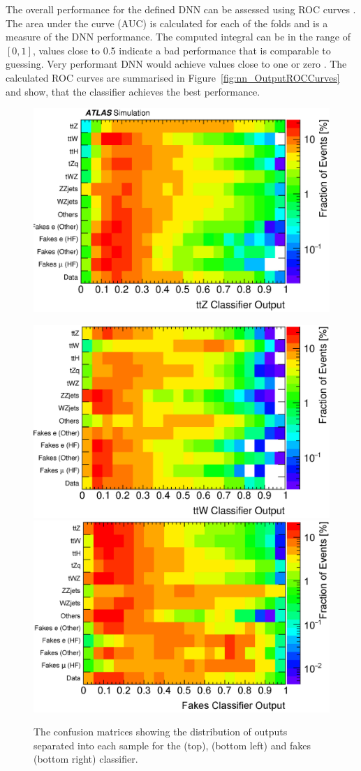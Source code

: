 \documentclass[bachelor,oneside, BCOR10mm,
			ngerman,english  %
]{GAUBM}
\begin{document}
 The overall performance for the defined DNN can be assessed using ROC curves \cite{nn_roccurve}. The area under the curve (AUC) is calculated for each of the folds and is a measure of the DNN performance. The computed integral can be in the range of $[0,1]$, values close to 0.5 indicate a bad performance that is comparable to guessing. Very performant DNN would achieve values close to one or zero \cite{nn_roccurve}. The calculated ROC curves are summarised in Figure~\ref{fig:nn_OutputROCCurves} and show, that the \ttbarW classifier achieves the best performance. %
 
\begin{figure}
	\centering
	\includegraphics[width=.42\textwidth]{figures/neural_networks/output/MyModel_Confusion_ttZ.eps}
	
	\includegraphics[width=.42\textwidth]{figures/neural_networks/output/MyModel_Confusion_ttW.eps}\hspace{8mm}
	\includegraphics[width=.424\textwidth]{figures/neural_networks/output/MyModel_Confusion_Fakes.eps}
	\caption{The confusion matrices showing the distribution of outputs separated into each sample for the \ttbarZ (top), \ttbarW (bottom left) and fakes (bottom right) classifier.}
	\label{fig:ConfusionMatricies}
\end{figure}
\end{document}
